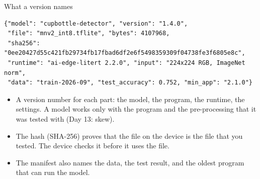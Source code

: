 \begin{frame}[fragile]{What a version names}
\begin{lstlisting}[basicstyle=\ttfamily\scriptsize]
{"model": "cupbottle-detector", "version": "1.4.0",
 "file": "mnv2_int8.tflite", "bytes": 4107968,
 "sha256": "0ee20427d55c421fb29734fb17fbad6df2e6f5498359309f04738fe3f6805e8c",
 "runtime": "ai-edge-litert 2.2.0", "input": "224x224 RGB, ImageNet norm",
 "data": "train-2026-09", "test_accuracy": 0.752, "min_app": "2.1.0"}
\end{lstlisting}
  \small
  \begin{itemize}
    \item A version number for each part: the model, the program, the
          runtime, the settings. A model works only with the program and
          the pre-processing that it was tested with (Day 13: skew).
    \item The hash (SHA-256) proves that the file on the device is the file
          that you tested. The device checks it before it uses the file.
    \item The manifest also names the data, the test result, and the
          oldest program that can run the model.
  \end{itemize}
\end{frame}

